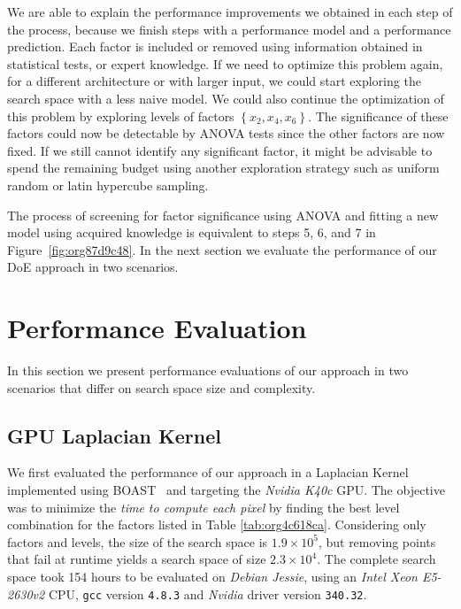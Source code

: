 \documentclass[conference]{IEEEtran}
\begin{document}
We are able to explain the performance improvements we obtained in each step of
the process, because we finish steps with a performance model and a performance
prediction. Each factor is included or removed using information obtained in
statistical tests, or expert knowledge. If we need to optimize this problem
again, for a different architecture or with larger input, we could start
exploring the search space with a less naive model. We could also continue the
optimization of this problem by exploring levels of factors
\(\left\{x_2,x_4,x_6\right\}\). The significance of these factors could now be
detectable by ANOVA tests since the other factors are now fixed. If we still
cannot identify any significant factor, it might be advisable to spend the
remaining budget using another exploration strategy such as uniform random or
latin hypercube sampling.

The process of screening for factor significance using ANOVA and fitting a new
model using acquired knowledge is equivalent to steps 5, 6, and 7 in
Figure~\ref{fig:org87d9c48}. In the next section we evaluate the
performance of our DoE approach in two scenarios.
\section{Performance Evaluation}
\label{sec:org8c50e6d}
In this section we present performance evaluations of our approach in two
scenarios that differ on search space size and complexity.
\vspace{-5pt}
\subsection{GPU Laplacian Kernel}
\label{sec:org2b29c38}
We first evaluated the performance of our approach in a Laplacian Kernel
implemented using BOAST~\cite{videau2017boast} and targeting the \emph{Nvidia
K40c} GPU. The objective was to minimize the \emph{time to compute each pixel} by
finding the best level combination for the factors listed in Table
\ref{tab:org4c618ca}. Considering only factors and levels, the size of the
search space is \(1.9\times10^5\), but removing points that fail at runtime yields
a search space of size \(2.3\times10^4\). The complete search space took 154 hours
to be evaluated on \emph{Debian Jessie}, using an \emph{Intel Xeon E5-2630v2} CPU,
\texttt{gcc} version \texttt{4.8.3} and \emph{Nvidia} driver version \texttt{340.32}.
\end{document}
